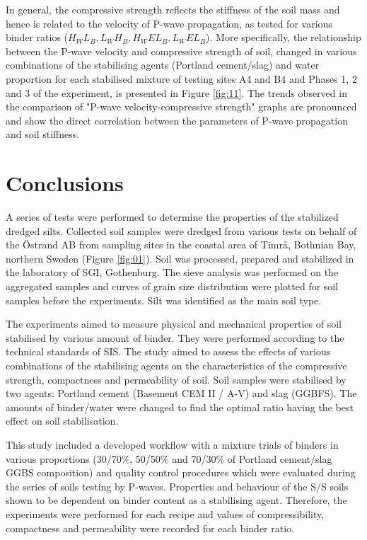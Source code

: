 \documentclass{amestyle}
\begin{document}
In general, the compressive strength reflects the stiffness of the soil mass and hence is related to the velocity of P-wave propagation, as tested for various binder ratios ($H_WL_B, L_WH_B, H_WEL_B, L_WEL_B$). More specifically, the relationship between the P-wave velocity and compressive strength of soil, changed in various combinations of the stabilising agents (Portland cement/slag) and water proportion for each stabilised mixture of testing sites A4 and B4 and Phases 1, 2 and 3 of the experiment, is presented in Figure \ref{fig:11}. The trends observed in the comparison of "P-wave velocity-compressive strength" graphs are pronounced and show the direct correlation between the parameters of P-wave propagation and soil stiffness. 

\section{Conclusions}
\label{sec:conclusions}

A series of tests were performed to determine the properties of the stabilized dredged silts. Collected soil samples were dredged from various tests on behalf of the Östrand AB from sampling sites in the coastal area of Timrå, Bothnian Bay, northern Sweden (Figure \ref{fig:01}). Soil was processed, prepared and stabilized in the laboratory of SGI, Gothenburg. The sieve analysis was performed on the aggregated samples and curves of grain size distribution were plotted for soil samples before the experiments. Silt was identified as the main soil type. 

The experiments aimed to measure physical and mechanical properties of soil stabilised by various amount of binder. They were performed according to the technical standards of SIS. The study aimed to assess the effects of various combinations of the stabilising agents on the characteristics of the compressive strength, compactness and permeability of soil. Soil samples were stabilised by two agents: Portland cement (Basement CEM II / A-V) and slag (GGBFS). The amounts of binder/water were changed to find the optimal ratio having the best effect on soil stabilisation. 

This study included a developed workflow with a mixture trials of binders in various proportions (30/70\%, 50/50\% and 70/30\% of Portland cement/slag GGBS composition) and quality control procedures which were evaluated during the series of soils testing by P-waves. Properties and behaviour of the S/S soils shown to be dependent on binder content as a stabilising agent. Therefore, the experiments were performed for each recipe and values of compressibility, compactness and permeability were recorded for each binder ratio. 
\end{document}
